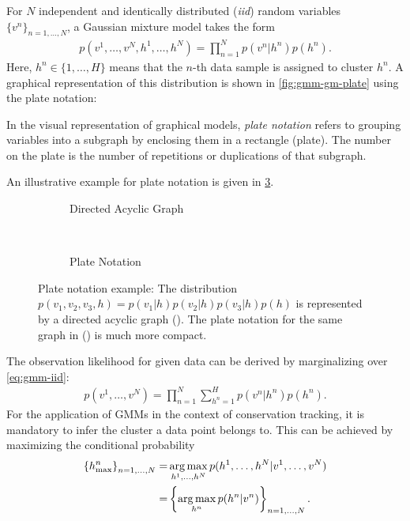 For $N$ independent and
identically distributed (\emph{iid}) random variables $\{v^n\}_{n=1,\hdots ,N}$, a Gaussian mixture model takes the form
\begin{align}
    \label{eq:gmm-iid}
    p(v^1,\dots ,v^N, h^1, \dots ,h^N) = \prod_{n=1}^N p(v^n|h^n)p(h^n).
\end{align}
Here, $h^n \in \{1,\hdots ,H\}$ means that the $n$-th data sample is assigned to cluster $h^n$.  A
graphical representation of this distribution is shown in \cref{fig:gmm-gm-plate} using the plate
notation:
\begin{mydef}
    In the visual representation of graphical models, \emph{plate notation} refers to grouping
    variables into a subgraph by enclosing them in a rectangle (plate). The number on the plate is
    the number of repetitions or duplications of that subgraph.
\end{mydef}
An illustrative example for plate notation is given in \cref{fig:gmm-plate-expl}.
\begin{figure}
    \centering
    \begin{subfigure}[t]{0.48\textwidth}
        \centering
        
        \caption{Directed Acyclic Graph}
        \label{fig:gmm-plate-expl-dag}
    \end{subfigure}
    ~
    \begin{subfigure}[t]{0.48\textwidth}
        \centering
        
        \caption{Plate Notation}
        \label{fig:gmm-plate-expl-plate}
    \end{subfigure}
    \caption[Plate notation example]{Plate notation example: The distribution $p(v_1,v_2,v_3,h) =
        p(v_1|h)p(v_2|h)p(v_3|h)p(h)$ is represented by a directed acyclic graph
        (). The plate notation for the same graph in
        () is much  more compact.}
    \label{fig:gmm-plate-expl}
\end{figure}
The observation likelihood for given data can be derived by marginalizing over \cref{eq:gmm-iid}:
\begin{align}
    \label{eq:gmm-obs-likelihood}
    p(v^1,\hdots ,v^N) = \prod_{n=1}^N\sum_{h^n=1}^Hp(v^n|h^n)p(h^n).
\end{align}
For the application of GMMs in the context of conservation tracking, it is mandatory to infer the
cluster a data point belongs to. This can be achieved by maximizing the conditional probability
\begin{align}
    \label{eq:gmm-assign-clusters}
    \left\{ h_{\max }^n\right\}_{n=1,\hdots ,N} = &\operatorname*{arg\,max}_{ h^1, \hdots ,h^N} p(h^1, \dots ,h^N|v^1,
    \hdots ,v^N) \\
    = & \left\{ \operatorname*{arg\,max}_{h^n} p(h^n|v^n) \right\}_{n=1,\hdots ,N}.
\end{align}
